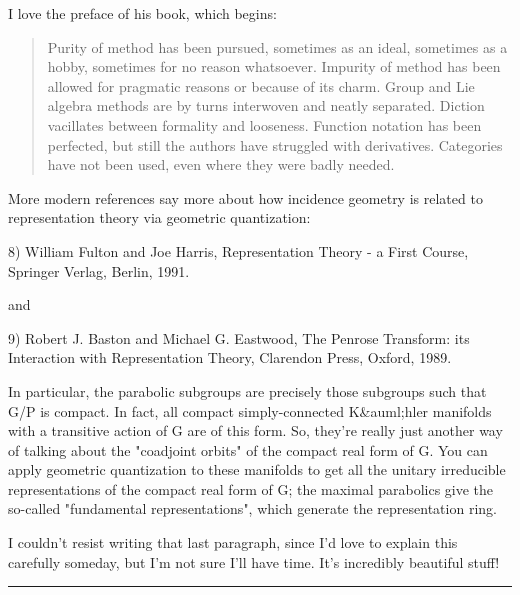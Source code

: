 I love the preface of his book, which begins:

\begin{quote}
     Purity of method has been pursued, sometimes as an ideal, sometimes
     as a hobby, sometimes for no reason whatsoever.  Impurity of method
     has been allowed for pragmatic reasons or because of its charm.
     Group and Lie algebra methods are by turns interwoven and neatly
     separated.  Diction vacillates between formality and looseness.
     Function notation has been perfected, but still the authors have
     struggled with derivatives.  Categories have not been used, even 
     where they were badly needed.
\end{quote}
    
More modern references say more about how incidence geometry is
related to representation theory via geometric quantization:

8)  William Fulton and Joe Harris, Representation Theory - a First
Course, Springer Verlag, Berlin, 1991.

and 

9) Robert J. Baston and Michael G. Eastwood, The Penrose Transform:
its Interaction with Representation Theory, Clarendon Press, Oxford,
1989.

In particular, the parabolic subgroups are precisely those subgroups
such that G/P is compact.  In fact, all compact simply-connected K&auml;hler
manifolds with a transitive action of G are of this form.  So, they're
really just another way of talking about the "coadjoint
orbits" of the compact real form of G.  You can apply geometric
quantization to these manifolds to get all the unitary irreducible
representations of the compact real form of G; the maximal parabolics
give the so-called "fundamental representations", which
generate the representation ring.

I couldn't resist writing that last paragraph, since I'd love to 
explain this carefully someday, but I'm not sure I'll have time.
It's incredibly beautiful stuff!

\par\noindent\rule{\textwidth}{0.4pt}


